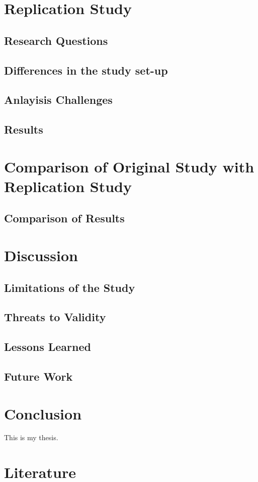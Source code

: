 \documentclass{uvamscse}
\begin{document}
\chapter{Replication Study}

\section{Research Questions}

\section{Differences in the study set-up}

\section{Anlayisis Challenges}

\section{Results}




\chapter{Comparison of Original Study with Replication Study}

\section{Comparison of Results}




\chapter{Discussion}

\section{Limitations of the Study}

\section{Threats to Validity}

\section{Lessons Learned}

\section{Future Work}





\chapter{Conclusion}

This is my thesis.

\chapter{Literature}\label{sec:biblio}
{%


}
\end{document}
